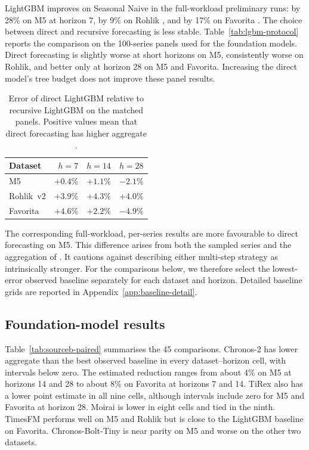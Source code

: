 LightGBM improves on Seasonal Naive in the full-workload preliminary runs: by
28\% on M5 \WRMSSE{} at horizon 7, by 9\% on Rohlik \WAPE{}, and by 17\% on
Favorita \WAPE{}. The choice between direct and recursive forecasting is less
stable. Table~\ref{tab:lgbm-protocol} reports the comparison on the 100-series
panels used for the foundation models. Direct forecasting is slightly worse
at short horizons on M5, consistently worse on Rohlik, and better only at
horizon 28 on M5 and Favorita. Increasing the direct model's tree budget does
not improve these panel results.

\begin{table}[htbp]
\centering
\caption{Error of direct LightGBM relative to recursive LightGBM on the
matched panels. Positive values mean that direct forecasting has higher
aggregate \WAPE{}.}
\label{tab:lgbm-protocol}\label{tab:t52}\label{tab:t52b}\label{tab:t58}
\small
\begin{tabular}{lrrr}
\toprule
Dataset & $h=7$ & $h=14$ & $h=28$ \\
\midrule
M5 & $+0.4\%$ & $+1.1\%$ & $-2.1\%$ \\
Rohlik~v2 & $+3.9\%$ & $+4.3\%$ & $+4.0\%$ \\
Favorita & $+4.6\%$ & $+2.2\%$ & $-4.9\%$ \\
\bottomrule
\end{tabular}
\end{table}

The corresponding full-workload, per-series results are more favourable to
direct forecasting on M5. This difference arises from both the sampled series
and the aggregation of \WAPE{}. It cautions against describing either
multi-step strategy as intrinsically stronger. For the comparisons below, we
therefore select the lowest-error observed baseline separately for each
dataset and horizon. Detailed baseline grids are reported in
Appendix~\ref{app:baseline-detail}.

\subsection{Foundation-model results}
\label{sec:fmresults_pointer}\label{sec:fm_results}

Table~\ref{tab:sourceb-paired} summarises the 45 comparisons. Chronos-2 has lower
aggregate \WAPE{} than the best observed baseline in every dataset--horizon
cell, with intervals below zero. The estimated reduction ranges from about
4\% on M5 at horizons 14 and 28 to about 8\% on Favorita at horizons 7 and 14.
TiRex also has a lower point estimate in all nine cells, although intervals
include zero for M5 and Favorita at horizon 28. Moirai is lower in eight cells
and tied in the ninth. TimesFM performs well on M5 and Rohlik but is close to
the LightGBM baseline on Favorita. Chronos-Bolt-Tiny is near parity on M5 and
worse on the other two datasets.

